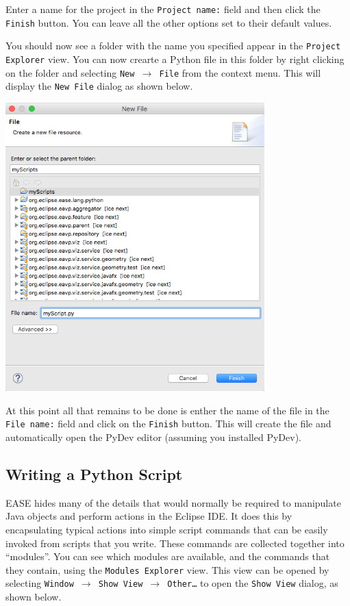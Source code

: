 \documentclass{article}
\begin{document}
Enter a name for the project in the \texttt{Project name:} field and then click the
\texttt{Finish} button. You can leave all the other options set to their default
values.

You should now see a folder with the name you specified appear in the
\texttt{Project Explorer} view. You can now crearte a Python file in this folder by
right clicking on the folder and selecting \texttt{New $\rightarrow$ File} from
the context menu. This will display the \texttt{New File} dialog as shown below.

\begin{center}
\includegraphics[width=10cm]{images/newfile}
\end{center}

At this point all that remains to be done is enther the name of the file in the
\texttt{File name:} field and click on the \texttt{Finish} button. This will
create the file and automatically open the PyDev editor (assuming you installed
PyDev).

\subsection{Writing a Python Script}

EASE hides many of the details that would normally be required to manipulate
Java objects and perform actions in the Eclipse IDE. It does this by
encapsulating typical actions into simple script commands that can be easily
invoked from scripts that you write. These commands are collected together into
``modules''. You can see which modules are available, and the commands that they
contain, using the \texttt{Modules Explorer} view. This view can be opened by
selecting \texttt{Window $\rightarrow$ Show View $\rightarrow$ Other\ldots} to
open the \texttt{Show View} dialog, as shown below.
\end{document}
